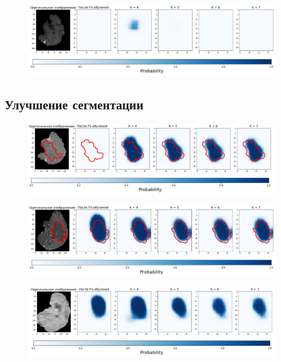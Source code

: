 \begin{figure}[h!] 
  \center
  \includegraphics [scale=0.7] {images/bad_3.png}
\end{figure}


\subsection{Улучшение сегментации}

\begin{figure}[h!] 
  \center
  \includegraphics [scale=0.7] {images/good_1.png}
\end{figure}


\begin{figure}[h!] 
  \center
  \includegraphics [scale=0.7] {images/good_2.png}
\end{figure}

\begin{figure}[h!] 
  \center
  \includegraphics [scale=0.7] {images/good_3.png}
\end{figure}

